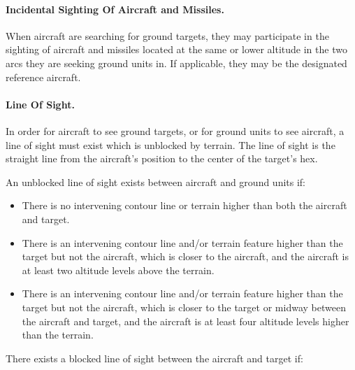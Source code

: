 \paragraph{Incidental Sighting Of Aircraft and Missiles.} When aircraft are searching for ground targets, they may participate in the sighting of aircraft and missiles located at the same or lower altitude in the two arcs they are seeking ground units in. If applicable, they may be the designated reference aircraft.

\paragraph{Line Of Sight.} In order for aircraft to see ground targets, or for ground units to see aircraft, a line of sight must exist which is unblocked by terrain. The line of sight is the straight line from the aircraft's position to the center of the target's hex.

An unblocked line of sight exists between aircraft and ground units if:

\begin{itemize}
    \item There is no intervening contour line or terrain higher than both the aircraft and target.
    \item There is an intervening contour line and/or terrain feature higher than the target but not the aircraft, which is closer to the aircraft, and the aircraft is at least two altitude levels above the terrain.
    \item There is an intervening contour line and/or terrain feature higher than the target but not the aircraft, which is closer to the target or midway between the aircraft and target, and the aircraft is at least four altitude levels higher than the terrain.
\end{itemize}

There exists a blocked line of sight between the aircraft and target if:

